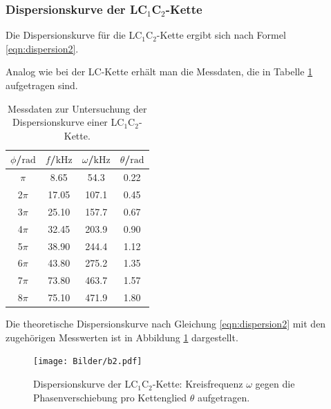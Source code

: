 \FloatBarrier
\subsubsection{Dispersionskurve der LC$_1$C$_2$-Kette}
Die Dispersionskurve für die LC$_1$C$_2$-Kette ergibt sich nach Formel \eqref{eqn:dispersion2}.

Analog wie bei der LC-Kette erhält man die Messdaten, die in Tabelle \ref{tab:dispersioncc}
aufgetragen sind.

\begin{table}
	\caption{Messdaten zur Untersuchung der Dispersionskurve einer LC$_1$C$_2$-Kette.}
	\label{tab:dispersioncc}
	\centering
	\begin{tabular}{cccc}
		\toprule
		$\phi$/$\si{\radian}$ & $f$/$\si{\kilo\Hz}$ & $\omega$/$\si{\kilo\Hz}$ & $\theta$/$\si{\radian}$ \\
		\midrule
		$\pi$                 & 8.65                & 54.3                     & 0.22                    \\
		2$\pi$                & 17.05               & 107.1                    & 0.45                    \\
		3$\pi$                & 25.10               & 157.7                    & 0.67                    \\
		4$\pi$                & 32.45               & 203.9                    & 0.90                    \\
		5$\pi$                & 38.90               & 244.4                    & 1.12                    \\
		6$\pi$                & 43.80               & 275.2                    & 1.35                    \\
		7$\pi$                & 73.80               & 463.7                    & 1.57                    \\
		8$\pi$                & 75.10               & 471.9                    & 1.80                    \\
		\bottomrule
	\end{tabular}
\end{table}

Die theoretische Dispersionskurve nach Gleichung \eqref{eqn:dispersion2} mit den zugehörigen Messwerten ist in Abbildung \ref{fig:dispicc} dargestellt.

\begin{figure}
	\centering
	\texttt{[image: Bilder/b2.pdf]}
	\caption{Dispersionskurve der LC$_1$C$_2$-Kette: Kreisfrequenz $\omega$ gegen die Phasenverschiebung pro Kettenglied $\theta$ aufgetragen.}
	\label{fig:dispicc}
\end{figure}



